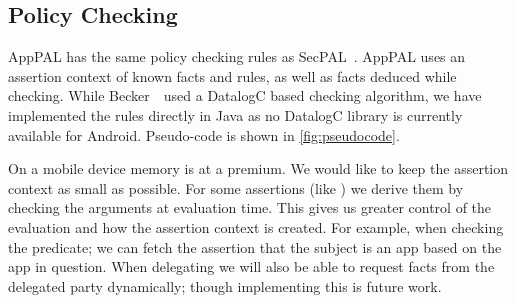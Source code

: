 \documentclass[]{llncs}
\begin{document}
\subsection{Policy Checking}
\label{ssec:eval}

AppPAL has the same policy checking rules as SecPAL~\cite{Becker:2006vh}.
AppPAL uses an assertion context of known facts and rules, as well as facts deduced while checking.
While Becker~\etal~used a DatalogC based checking algorithm, we have implemented the rules directly in Java as no DatalogC library is currently available for Android.
Pseudo-code is shown in \autoref{fig:pseudocode}.

On a mobile device memory is at a premium.
We would like to keep the assertion context as small as possible.
For some assertions (like ) we derive them by checking the arguments at evaluation time.
This gives us greater control of the evaluation and how the assertion context is created.
For example, when checking the  predicate;
  we can fetch the assertion that the subject is an app based on the app in question.
When delegating we will also be able to request facts from the delegated party dynamically; though implementing this is future work.
\end{document}
